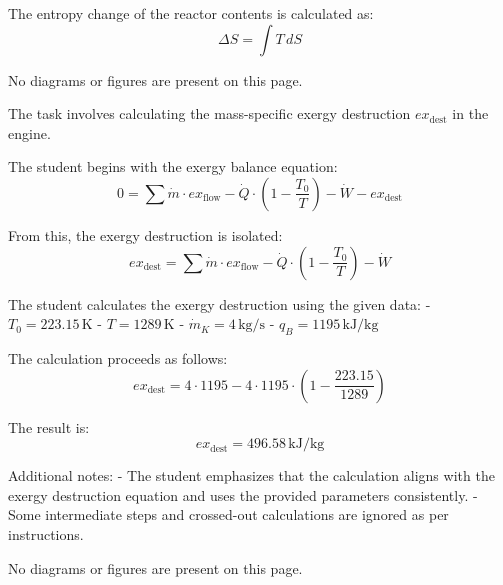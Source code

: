 The entropy change of the reactor contents is calculated as:  
\[
\Delta S = \int T \, dS
\]  

No diagrams or figures are present on this page.

The task involves calculating the mass-specific exergy destruction \( ex_{\text{dest}} \) in the engine.  

The student begins with the exergy balance equation:  
\[
0 = \sum \dot{m} \cdot ex_{\text{flow}} - \dot{Q} \cdot \left( 1 - \frac{T_0}{T} \right) - \dot{W} - ex_{\text{dest}}
\]  

From this, the exergy destruction is isolated:  
\[
ex_{\text{dest}} = \sum \dot{m} \cdot ex_{\text{flow}} - \dot{Q} \cdot \left( 1 - \frac{T_0}{T} \right) - \dot{W}
\]  

The student calculates the exergy destruction using the given data:  
- \( T_0 = 223.15 \, \text{K} \)  
- \( T = 1289 \, \text{K} \)  
- \( \dot{m}_K = 4 \, \text{kg/s} \)  
- \( q_B = 1195 \, \text{kJ/kg} \)  

The calculation proceeds as follows:  
\[
ex_{\text{dest}} = 4 \cdot 1195 - 4 \cdot 1195 \cdot \left( 1 - \frac{223.15}{1289} \right)
\]  

The result is:  
\[
ex_{\text{dest}} = 496.58 \, \text{kJ/kg}
\]  

Additional notes:  
- The student emphasizes that the calculation aligns with the exergy destruction equation and uses the provided parameters consistently.  
- Some intermediate steps and crossed-out calculations are ignored as per instructions.  

No diagrams or figures are present on this page.